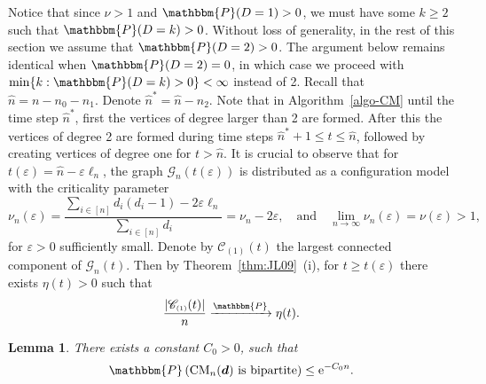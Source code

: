 \documentclass[11pt,a4paper, reqno]{article}
\numberwithin{equation}{section}
\numberwithin{equation}{section}
\def\sss{\scriptscriptstyle}
\newcommand{\prob}[1]{\ensuremath{\mathbbm{P}\left(#1\right)}}
\newcommand{\pto}{\ensuremath{\xrightarrow{\mathbbm{P}}}}
\newcommand{\PR}{\ensuremath{\mathbbm{P}}}
\newcommand{\e}{\ensuremath{\mathrm{e}}}
\newcommand{\1}{\ensuremath{\mathbbm{1}}}
\newcommand{\CM}{\ensuremath{\mathrm{CM}_n(\boldsymbol{d})}}
\newcommand{\sCL}{\mathscr{C}_{\sss (1)}}
\newtheorem{lemma}[theorem]{Lemma}
\numberwithin{equation}{section}
\numberwithin{theorem}{section}
\begin{document}
Notice that since $\nu>1$ and $\PR(D=1)> 0$, we must have some $k\geq 2$ such that $\PR(D=k)>0$. 
Without loss of generality, in the rest of this section we assume that $\PR(D=2)>0$. The argument below remains identical when $\PR(D=2)=0$, in which case we proceed with $\min\{k: \PR(D=k) >0\}<\infty$ instead of 2. 
Recall that $\hat{n} = n-n_0-n_1$.
Denote $\hat{n}^* = \hat{n}-n_2$.
Note that in Algorithm~\ref{algo-CM} until the time step $\hat{n}^*$, first the vertices of degree larger than 2 are formed.
After this the vertices of degree 2 are formed during time steps $\hat{n}^*+1\leq t\leq \hat{n}$, followed by creating vertices of degree one for $t>\hat{n}$. 
It is crucial to observe that for $t(\varepsilon) = \hat{n} - \varepsilon \ell_n$, the graph $\mathcal{G}_n(t(\varepsilon))$ is distributed as a configuration model with the criticality parameter
\begin{equation}
\nu_n(\varepsilon) =\frac{\sum_{i\in [n]}d_i(d_i-1)-2\varepsilon \ell_n}{\sum_{i\in [n]}d_i} =\nu_n -2\varepsilon, \quad \text{and} \quad \lim_{n\to\infty}\nu_n(\varepsilon) = \nu(\varepsilon)>1,
\end{equation}
for $\varepsilon>0$ sufficiently small.
Denote by $\mathscr{C}_{\sss (1)}(t)$ the largest connected component of $\mathcal{G}_n(t)$.
Then by Theorem~\ref{thm:JL09}~(i), for $t\geq t(\varepsilon)$ there exists $\eta (t)>0$ such that 
\begin{equation}\label{eq:giant-G-eps}
\frac{|\sCL(t)|}{n} \pto \eta(t). 
\end{equation}
\begin{lemma}\label{lem:prob-bipartite}
There exists a constant $C_0>0$, such that 
\begin{equation}\label{eq:prob-bip-exp}
\prob{\CM \text{ is bipartite}}\leq \e^{-C_0 n}.
\end{equation}  
\end{lemma}
\end{document}
